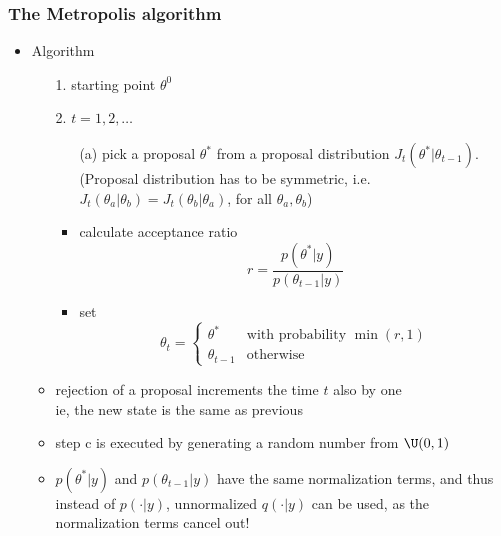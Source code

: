 \documentclass[10pt]{beamer}
\begin{document}
\begin{frame}

\frametitle{The Metropolis algorithm}

  \begin{itemize}
  \item Algorithm
    \begin{itemize}
      \item[1.] starting point $\theta^0$
      \item[2.] $t=1,2,\ldots$
        \begin{itemize}
        \item[(a)] pick a proposal $\theta^{*}$ from a {\color{uured} proposal distribution}
          $J_t(\theta^{*}|\theta_{t-1})$. \\
          (Proposal distribution has to be symmetric, i.e.\\
          $J_t(\theta_a|\theta_b)=J_t(\theta_b|\theta_a)$, for all
          $\theta_a,\theta_b$)
        \item<2->[(b)] calculate acceptance ratio
          \begin{equation*}
            r=\frac{p(\theta^{*}|y)}{p(\theta_{t-1}|y)}
          \end{equation*}
          \vspace{-6mm}
        \item<3->[(c)] set
          \begin{equation*}
            \theta_t=
            \begin{cases}
              \theta^{*} & \text{with probability $\min(r,1)$}\\
              \theta_{t-1} & \text{otherwise}
            \end{cases}
          \end{equation*}
      \end{itemize}
      \vspace{-1.5\baselineskip}
    \item<5-> rejection of a proposal increments the time $t$ also by one\\
      ie, the new state is the same as previous
      \item<6-> step c is executed by generating a random number from
        $\U(0,1)$
      \item<7-> $p(\theta^*|y)$ and $p(\theta_{t-1}|y)$ have the same
        normalization terms, and thus instead of $p(\cdot|y)$,
        unnormalized $q(\cdot|y)$ can be used, { \color{uured} as the normalization terms cancel out}!
    \end{itemize}
  \end{itemize}

\end{frame}
\end{document}
